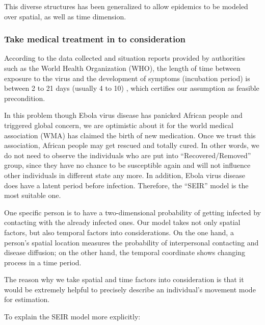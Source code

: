 \documentclass[11pt]{article}
\begin{document}
This diverse structures has been generalized to allow epidemics to be modeled over spatial, as well as time dimension.

\subsubsection{Take medical treatment in to consideration}

According to the data collected and situation reports provided by authorities such as the World Health Organization (WHO), the length of time between exposure to the virus and the development of symptoms (incubation period) is between 2 to 21 days (usually 4 to 10) \cite{Ebolavirusdisease}, which certifies our assumption as feasible precondition. 

In this problem though Ebola virus disease has panicked African people and triggered global concern, we are optimistic about it for the world medical association (WMA) has claimed the birth of new medication. Once we trust this association, African people may get rescued and totally cured. In other words, we do not need to observe the individuals who are put into ``Recovered/Removed'' group, since they have no chance to be susceptible again and will not influence other individuals in different state any more. In addition, Ebola virus disease does have a latent period before infection. Therefore, the ``SEIR'' model is the most suitable one.

One specific person is to have a two-dimensional probability of getting infected by contacting with the already infected ones. Our model takes not only spatial factors, but also temporal factors into considerations. On the one hand, a person's spatial location measures the probability of interpersonal contacting and disease diffusion; on the other hand, the temporal coordinate shows changing process in a time period.

The reason why we take spatial and time factors into consideration is that it would be extremely helpful to precisely describe an individual’s movement mode for estimation.

To explain the SEIR model more explicitly:
\end{document}
